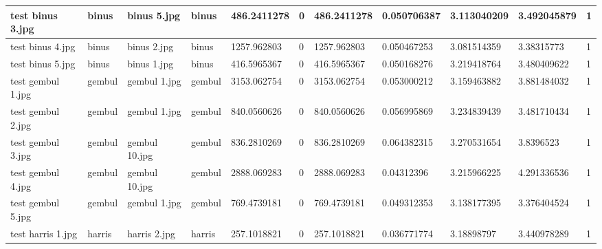 \begin{landscape}
\begin{longtable}{|p{2cm}|p{1.5cm}|p{2cm}|p{1.5cm}|p{2cm}|p{1cm}|p{2cm}|p{2cm}|p{2cm}|p{2cm}|p{1cm}|}
		test binus 3.jpg     & binus            & binus 5.jpg           & binus                       & 486.2411278           & 0                       & 486.2411278                & 0.050706387           & 3.113040209           & 3.492045879              & 1                \\ \hline
		test binus 4.jpg     & binus            & binus 2.jpg           & binus                       & 1257.962803           & 0                       & 1257.962803                & 0.050467253           & 3.081514359           & 3.38315773               & 1                \\ \hline
		test binus 5.jpg     & binus            & binus 1.jpg           & binus                       & 416.5965367           & 0                       & 416.5965367                & 0.050168276           & 3.219418764           & 3.480409622              & 1                \\ \hline
		test gembul 1.jpg    & gembul           & gembul 1.jpg          & gembul                      & 3153.062754           & 0                       & 3153.062754                & 0.053000212           & 3.159463882           & 3.881484032              & 1                \\ \hline
		test gembul 2.jpg    & gembul           & gembul 1.jpg          & gembul                      & 840.0560626           & 0                       & 840.0560626                & 0.056995869           & 3.234839439           & 3.481710434              & 1                \\ \hline
		test gembul 3.jpg    & gembul           & gembul 10.jpg         & gembul                      & 836.2810269           & 0                       & 836.2810269                & 0.064382315           & 3.270531654           & 3.8396523                & 1                \\ \hline
		test gembul 4.jpg    & gembul           & gembul 10.jpg         & gembul                      & 2888.069283           & 0                       & 2888.069283                & 0.04312396            & 3.215966225           & 4.291336536              & 1                \\ \hline
		test gembul 5.jpg    & gembul           & gembul 1.jpg          & gembul                      & 769.4739181           & 0                       & 769.4739181                & 0.049312353           & 3.138177395           & 3.376404524              & 1                \\ \hline
		test harris 1.jpg    & harris           & harris 2.jpg          & harris                      & 257.1018821           & 0                       & 257.1018821                & 0.036771774           & 3.18898797            & 3.440978289              & 1                \\ \hline

\end{longtable}
\end{landscape}
